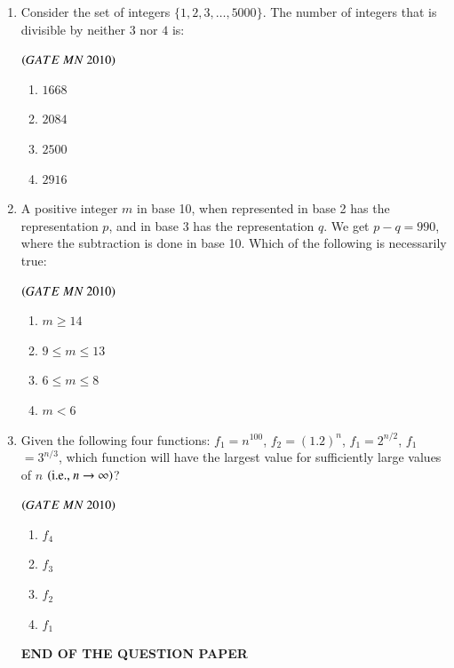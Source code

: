 \documentclass{article}
\begin{document}
\begin{enumerate}[label=Q.\arabic*., itemsep=1em, leftmargin=0pt, itemindent=*, labelsep=0.5em]
\begin{enumerate}[label=Q.\arabic*., start=17, leftmargin=2em]
\begin{enumerate}[label=Q.\arabic*., start=33, leftmargin=2em]
\bigskip
\item Consider the set of integers $\{1, 2, 3, \ldots, 5000\}$. The number of integers that is divisible by neither $3$ nor $4$ is:
\\
\begin{flushright}
\hfill$\left(GATE\ MN\ 2010\right)$
\end{flushright}
\begin{multicols}{4}
\begin{enumerate}[label=(\Alph*),leftmargin=4em]
\item $1668$
\item $2084$
\item $2500$
\item $2916$
\end{enumerate}
\end{multicols}
\bigskip
\item A positive integer $m$ in base 10, when represented in base 2 has the representation $p$, and in base 3 has the representation $q$. We get $p - q = 990$, where the subtraction is done in base 10. Which of the following is necessarily true:
\begin{flushright}
\hfill$\left(GATE\ MN\ 2010\right)$
\end{flushright}
\begin{multicols}{4}
\begin{enumerate}[label=(\Alph*),leftmargin=4em]
\item \(m \ge 14\)
\item \(9 \le m \le 13\)
\item \(6 \le m \le 8\)
\item \(m < 6\)
\end{enumerate}
\end{multicols}
\bigskip
\item Given the following four functions: 
$f_1 $$= n^{100}$, 
$f_2 $$ = (1.2)^n$, 
$f_1 $$ = 2^{n/2}$, 
$f_1 $$ = 3^{n/3}$, 
which function will have the largest value for sufficiently large values of $n$ $\left(\text{i.e., } n \to \infty\right)$?
\begin{flushright}
\hfill$\left(GATE\ MN\ 2010\right)$
\end{flushright}
\begin{multicols}{4}
\begin{enumerate}[label=(\Alph*),leftmargin=4em]
\item $f_4$
\item $f_3$
\item $f_2$
\item $f_1$
\end{enumerate}
\end{multicols}
\bigskip
\begin{center}



\Large\textbf{{END OF THE QUESTION PAPER}}
\end{center}
\end{enumerate}
\end{enumerate}
\end{enumerate}
\end{document}
